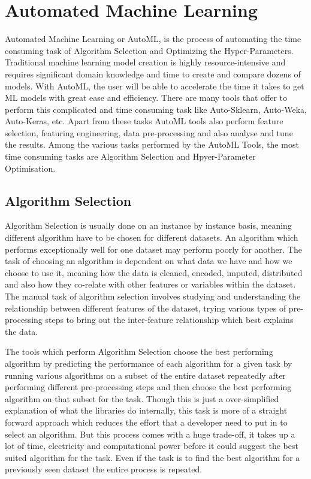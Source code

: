 \section{Automated Machine Learning}
Automated Machine Learning or AutoML, is the process of automating the time consuming task of Algorithm Selection and Optimizing the Hyper-Parameters. Traditional machine learning model creation is highly resource-intensive and requires significant domain knowledge and time to create and compare dozens of models. With AutoML, the user will be able to accelerate the time it takes to get ML models with great ease and efficiency. There are many tools that offer to perform this complicated and time consuming task like Auto-Sklearn, Auto-Weka, Auto-Keras, etc. Apart from these tasks AutoML tools also perform feature selection, featuring engineering, data pre-processing and also analyse and tune the results. Among the various tasks performed by the AutoML Tools, the most time consuming tasks are Algorithm Selection and Hpyer-Parameter Optimisation. 

\subsection{Algorithm Selection}
Algorithm Selection is usually done on an instance by instance basis, meaning different algorithm have to be chosen for different datasets. An algorithm which performs exceptionally well for one dataset may perform poorly for another. The task of choosing an algorithm is dependent on what data we have and how we choose to use it, meaning how the data is cleaned, encoded, imputed, distributed and also how they co-relate with other features or variables within the dataset. The manual task of algorithm selection involves studying and understanding the relationship between different features of the dataset, trying various types of pre-processing steps to bring out the inter-feature relationship which best explains the data. 

The tools which perform Algorithm Selection choose the best performing algorithm by predicting the performance of each algorithm for a given task by running various algorithms on a subset of the entire dataset repeatedly after performing different pre-processing steps and then choose the best performing algorithm on that subset for the task. Though this is just a over-simplified explanation of what the libraries do internally, this task is more of a straight forward approach which reduces the effort that a developer need to put in to select an algorithm. But this process comes with a huge trade-off, it takes up a lot of time, electricity and computational power before it could suggest the best suited algorithm for the task. Even if the task is to find the best algorithm for a previously seen dataset the entire process is repeated.

